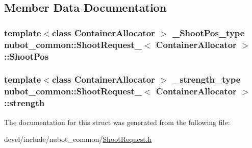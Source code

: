 \subsection{Member Data Documentation}
\hypertarget{structnubot__common_1_1ShootRequest___a6b09e65ac8068456b700c42493fd2080}{
\subsubsection[{Shoot\-Pos}]{\setlength{\rightskip}{0pt plus 5cm}template$<$class Container\-Allocator $>$ {\bf \-\_\-\-Shoot\-Pos\-\_\-type} {\bf nubot\-\_\-common\-::\-Shoot\-Request\-\_\-}$<$ Container\-Allocator $>$\-::Shoot\-Pos}}\label{structnubot__common_1_1ShootRequest___a6b09e65ac8068456b700c42493fd2080}
\hypertarget{structnubot__common_1_1ShootRequest___a33f2f4aab994664c57182ba1589b3483}{
\subsubsection[{strength}]{\setlength{\rightskip}{0pt plus 5cm}template$<$class Container\-Allocator $>$ {\bf \-\_\-strength\-\_\-type} {\bf nubot\-\_\-common\-::\-Shoot\-Request\-\_\-}$<$ Container\-Allocator $>$\-::strength}}\label{structnubot__common_1_1ShootRequest___a33f2f4aab994664c57182ba1589b3483}


The documentation for this struct was generated from the following file\-:\begin{DoxyCompactItemize}
\item 
devel/include/nubot\-\_\-common/\hyperlink{ShootRequest_8h}{Shoot\-Request.\-h}\end{DoxyCompactItemize}
